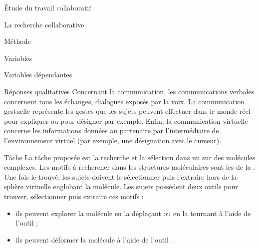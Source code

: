 \documentclass[myfrancais]{mythesis}
\begin{document}
\begin{mypart}{Étude du travail collaboratif}
\begin{mychapter}{La recherche collaborative}
\begin{mysection}{Méthode}
\begin{mysubsection}{Variables}
\begin{mysubsubsection}{Variables dépendantes}
\begin{myparagraph}{ Réponses qualitatives}
							Concernant la communication, les communications verbales concernent tous les échanges, dialogues exposés par la voix.
							La communication gestuelle représente les gestes que les sujets peuvent effectuer dans le monde réel pour expliquer ou pour désigner par exemple.
							Enfin, la communication virtuelle concerne les informations données au partenaire par l'intermédiaire de l'environnement virtuel (par exemple, une désignation avec le curseur).
						\end{myparagraph}
					\end{mysubsubsection}
				\end{mysubsection}
				\begin{mysubsection}[sse-exp1-Tache]{Tâche}
					La tâche proposée est la recherche et la sélection dans un  sur des molécules complexes.
					Les motifs à rechercher dans les structures moléculaires sont les  de la .
					Une fois le  trouvé, les sujets doivent le sélectionner puis l'extraire hors de la sphère virtuelle englobant la molécule.
					Les sujets possèdent deux outils pour trouver, sélectionner puis extraire ces motifs :
					\begin{itemize}
						\item ils peuvent explorer la molécule en la déplaçant ou en la tournant à l'aide de l'outil ;
						\item ils peuvent déformer la molécule à l'aide de l'outil .
					\end{itemize}


\end{mysubsection}
\end{mysection}
\end{mychapter}
\end{mypart}
\end{document}
